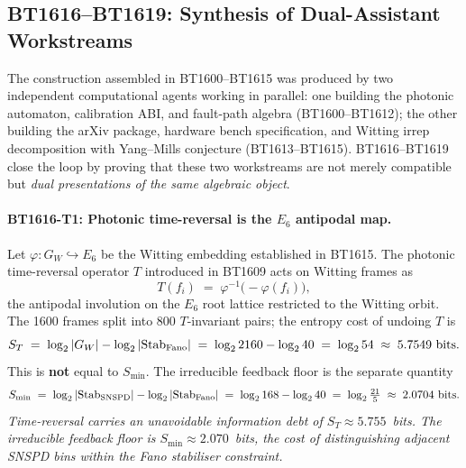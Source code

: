 \subsection*{BT1616--BT1619: Synthesis of Dual-Assistant Workstreams}
\label{sec:bt1620-synthesis}

\noindent
The construction assembled in BT1600--BT1615 was produced by two independent
computational agents working in parallel: one building the photonic automaton,
calibration ABI, and fault-path algebra (BT1600--BT1612); the other building
the arXiv package, hardware bench specification, and Witting irrep decomposition
with Yang--Mills conjecture (BT1613--BT1615).  BT1616--BT1619 close the loop by
proving that these two workstreams are not merely compatible but \emph{dual
presentations of the same algebraic object}.

\paragraph{BT1616-T1: Photonic time-reversal is the $E_6$ antipodal map.}
Let $\varphi\colon G_W \hookrightarrow E_6$ be the Witting embedding established
in BT1615.  The photonic time-reversal operator $T$ introduced in BT1609 acts on
Witting frames as
\[
  T(f_i) \;=\; \varphi^{-1}\!\bigl(-\varphi(f_i)\bigr),
\]
the antipodal involution on the $E_6$ root lattice restricted to the Witting orbit.
The 1600 frames split into 800 $T$-invariant pairs; the entropy cost of undoing $T$ is
\[
  S_T \;=\; \log_2 |G_W| - \log_2 |{\rm Stab}_{\rm Fano}|
      \;=\; \log_2 2160 - \log_2 40
      \;=\; \log_2 54
      \;\approx\; 5.7549~\text{bits}.
\]
This is \textbf{not} equal to $S_{\min}$.  The irreducible feedback floor is the
separate quantity
\[
  S_{\min} \;=\; \log_2 |{\rm Stab}_{\rm SNSPD}| - \log_2 |{\rm Stab}_{\rm Fano}|
           \;=\; \log_2 168 - \log_2 40
           \;=\; \log_2\tfrac{21}{5}
           \;\approx\; 2.0704~\text{bits.}
\]
\emph{Time-reversal carries an unavoidable information debt of $S_T \approx 5.755$~bits.
The irreducible feedback floor is $S_{\min} \approx 2.070$~bits, the cost of
distinguishing adjacent SNSPD bins within the Fano stabiliser constraint.}

